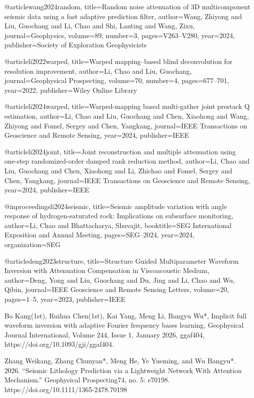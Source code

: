 @article{wang2024random,
  title={Random noise attenuation of 3D multicomponent seismic data using a fast adaptive prediction filter},
  author={Wang, Zhiyong and Liu, Guochang and Li, Chao and Shi, Lanting and Wang, Zixu},
  journal={Geophysics},
  volume={89},
  number={3},
  pages={V263--V280},
  year={2024},
  publisher={Society of Exploration Geophysicists}
}

@article{li2022warped,
  title={Warped mapping--based blind deconvolution for resolution improvement},
  author={Li, Chao and Liu, Guochang},
  journal={Geophysical Prospecting},
  volume={70},
  number={4},
  pages={677--701},
  year={2022},
  publisher={Wiley Online Library}
}

@article{li2024warped,
  title={Warped-mapping based multi-gather joint prestack Q estimation},
  author={Li, Chao and Liu, Guochang and Chen, Xiaohong and Wang, Zhiyong and Fomel, Sergey and Chen, Yangkang},
  journal={IEEE Transactions on Geoscience and Remote Sensing},
  year={2024},
  publisher={IEEE}
}

@article{li2024joint,
  title={Joint reconstruction and multiple attenuation using one-step randomized-order damped rank reduction method},
  author={Li, Chao and Liu, Guochang and Chen, Xiaohong and Li, Zhichao and Fomel, Sergey and Chen, Yangkang},
  journal={IEEE Transactions on Geoscience and Remote Sensing},
  year={2024},
  publisher={IEEE}
}

@inproceedings{li2024seismic,
  title={Seismic amplitude variation with angle response of hydrogen-saturated rock: Implications on subsurface monitoring},
  author={Li, Chao and Bhattacharya, Shuvajit},
  booktitle={SEG International Exposition and Annual Meeting},
  pages={SEG--2024},
  year={2024},
  organization={SEG}
}

@article{deng2023structure,
  title={Structure Guided Multiparameter Waveform Inversion with Attenuation Compensation in Viscoacoustic Medium},
  author={Deng, Yong and Liu, Guochang and Du, Jing and Li, Chao and Wu, Qibin},
  journal={IEEE Geoscience and Remote Sensing Letters},
  volume={20},
  pages={1--5},
  year={2023},
  publisher={IEEE}
}


Bo Kang(1st), Ruihua Chen(1st), Kai Yang, Meng Li, Bangyu Wu*, Implicit full waveform inversion with adaptive Fourier frequency bases learning, Geophysical Journal International, Volume 244, Issue 1, January 2026, ggaf404, https://doi.org/10.1093/gji/ggaf404.

Zhang Weikang, Zhang Chunyan*, Meng He, Ye Yueming, and Wu Bangyu*. 2026. “Seismic Lithology Prediction via a Lightweight Network With Attention Mechanism.” Geophysical Prospecting74, no. 5: e70198. https://doi.org/10.1111/1365-2478.70198

